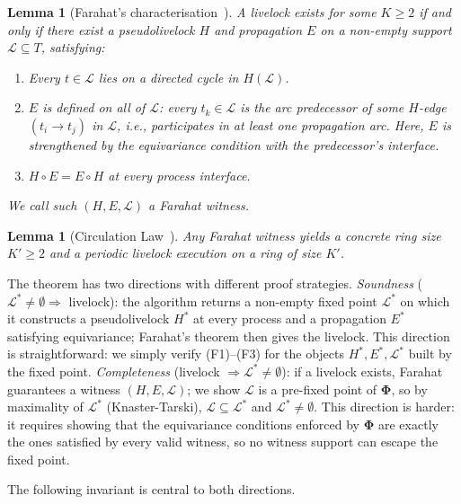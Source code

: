 \documentclass{article}
\newtheorem{lemma}[theorem]{Lemma}
\newcommand{\Ls}{\mathcal{L}^{*}}
\newcommand{\bPhi}{\boldsymbol{\Phi}}
\newcommand{\Hstar}{H^{*}}
\newcommand{\Estar}{E^{*}}
\begin{document}
\begin{lemma}[Farahat's characterisation~{\citep[Ch.~6]{farahat2012}}]
\label{lem:farahat}
A livelock exists for some $K\!\geq\!2$ if and only if there exist a
pseudolivelock $H$ and propagation $E$ on a non-empty support
$\mathcal{L}\subseteq T$, satisfying:
\begin{enumerate}
  \item[\textbf{(F1)}] Every $t\in\mathcal{L}$ lies on a directed cycle
        in $H(\mathcal{L})$.
  \item[\textbf{(F2)}] $E$ is defined on all of $\mathcal{L}$: every
        $t_k\in\mathcal{L}$ is the arc predecessor of some $H$-edge
        $(t_i\!\to\!t_j)$ in $\mathcal{L}$, i.e., participates in at
        least one propagation arc. Here, $E$ is strengthened by the equivariance condition with the predecessor's interface.
  \item[\textbf{(F3)}] $H\circ E = E\circ H$ at every process
        interface.
\end{enumerate}
We call such $(H,E,\mathcal{L})$ a \emph{Farahat witness}.
\end{lemma}

\begin{lemma}[Circulation Law~{\citep[Ch.~6]{farahat2012}}]
\label{lem:cl}
Any Farahat witness yields a concrete ring size $K'\geq 2$ and a
periodic livelock execution on a ring of size $K'$.
\end{lemma}

The theorem has two directions with different proof strategies.
\emph{Soundness} ($\Ls\neq\emptyset\Rightarrow$ livelock): the algorithm
returns a non-empty fixed point $\Ls$ on which it constructs a
pseudolivelock $\Hstar$ at every process and a propagation $\Estar$
satisfying equivariance; Farahat's theorem then gives the livelock.
This direction is straightforward: we simply verify (F1)--(F3) for the
objects $\Hstar,\Estar,\Ls$ built by the fixed point.
\emph{Completeness} (livelock $\Rightarrow\Ls\neq\emptyset$): if a
livelock exists, Farahat guarantees a witness $(H,E,\mathcal{L})$; we
show $\mathcal{L}$ is a pre-fixed point of $\bPhi$, so by maximality of
$\Ls$ (Knaster-Tarski), $\mathcal{L}\subseteq\Ls$ and $\Ls\neq\emptyset$.
This direction is harder: it requires showing that the equivariance
conditions enforced by $\bPhi$ are exactly the ones satisfied by every
valid witness, so no witness support can escape the fixed point.

The following invariant is central to both directions.
\end{document}

